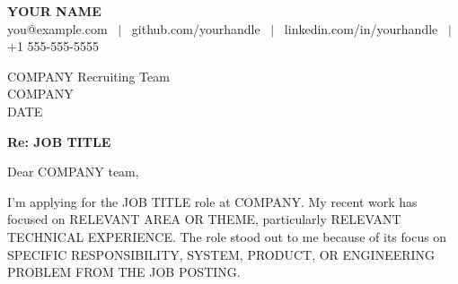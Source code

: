 \pagestyle{fancy}
\fancyhf{}
\fancyfoot{}
\renewcommand{\headrulewidth}{0pt}
\renewcommand{\footrulewidth}{0pt}

\addtolength{\oddsidemargin}{-0.5in}
\addtolength{\evensidemargin}{-0.5in}
\addtolength{\textwidth}{1in}
\addtolength{\topmargin}{-.5in}
\addtolength{\textheight}{1.0in}

\raggedbottom
\raggedright
\setlength{\tabcolsep}{0in}

\ifdefined\pdfgentounicode{}\fi

\setlength{\parindent}{0pt}
\setlength{\parskip}{6pt}

\newcommand{\YourName}{YOUR NAME}
\newcommand{\YourContact}{
you@example.com \, $|$ \,
github.com/yourhandle \, $|$ \,
linkedin.com/in/yourhandle \, $|$ \,
+1 555-555-5555
}

\newcommand{\RecipientName}{COMPANY Recruiting Team}
\newcommand{\RecipientOrg}{COMPANY}
\newcommand{\LetterDate}{DATE}
\newcommand{\LetterSubject}{Re: JOB TITLE}
\newcommand{\LetterGreeting}{Dear COMPANY team,}
\newcommand{\LetterSignoff}{Best,}



\begin{center}
    \textbf{\Huge \scshape \YourName} \\ \vspace{2pt}
    \small \YourContact
\end{center}

\RecipientName \\
\RecipientOrg \\
\LetterDate

\vspace{10pt}
\textbf{\LetterSubject}

\vspace{6pt}
\LetterGreeting

I'm applying for the JOB TITLE role at COMPANY. My recent work has focused on RELEVANT AREA OR THEME, particularly RELEVANT TECHNICAL EXPERIENCE. The role stood out to me because of its focus on SPECIFIC RESPONSIBILITY, SYSTEM, PRODUCT, OR ENGINEERING PROBLEM FROM THE JOB POSTING.


